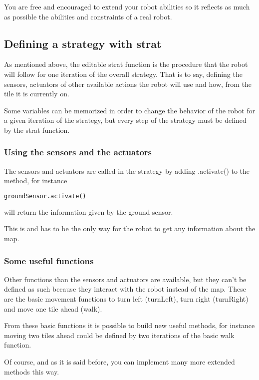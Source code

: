\documentclass[a4paper,11pt]{article}
\begin{document}
You are free and encouraged to extend your robot abilities so it
reflects as much as possible the abilities and constraints of a real
robot.

\subsection{Defining a strategy with strat}

As mentioned above, the editable strat function is the procedure that
the robot will follow for one iteration of the overall strategy.  That
is to say, defining the sensors, actuators of other available actions
the robot will use and how, from the tile it is currently on.

Some variables can be memorized in order to change the behavior of the
robot for a given iteration of the strategy, but every step of the
strategy must be defined by the strat function.

\subsubsection{Using the sensors and the actuators}

The sensors and actuators are called in the strategy by adding
.activate() to the method, for instance
\begin{lstlisting}[language=Python]
  groundSensor.activate()
\end{lstlisting}
will return the information given by the ground sensor.

This is and has to be the only way for the robot to get any
information about the map.

\subsubsection{Some useful functions}

Other functions than the sensors and actuators are available, but they
can't be defined as such because they interact with the robot instead
of the map. These are the basic movement functions to turn left
(turnLeft), turn right (turnRight) and move one tile ahead (walk).

From these basic functions it is possible to build new useful methods,
for instance moving two tiles ahead could be defined by two iterations
of the basic walk function.

Of course, and as it is said before, you can implement many more
extended methods this way.
\end{document}
